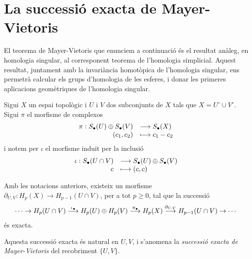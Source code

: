 \documentclass[../main.tex]{subfiles}
\begin{document}
\section{La successió exacta de Mayer-Vietoris}
El teorema de Mayer-Vietoris que enunciem a continuació és el resultat anàleg, en homologia singular, al corresponent teorema de l'homologia simplicial. Aquest resultat, juntament amb la invariància homotòpica de l'homologia singular, ens permetrà calcular els grups d'homologia de les esferes, i donar les primeres aplicacions geomètriques de l'homologia singular.

Sigui $X$ un espai topològic i $U$ i $V$ dos subconjunts de $X$ tals que $X = U^\circ\cup V^\circ$. Sigui $\pi$ el morfisme de complexos
\begin{equation}
    \notag
    \begin{array}{rl}
        \pi:S_\bullet(U)\oplus S_\bullet(V) & \longrightarrow S_\bullet(X) \\
        (c_1,c_2) & \longmapsto c_1-c_2
    \end{array}
\end{equation}
i notem per $\iota$ el morfisme induit per la inclusió
\begin{equation}
    \notag
    \begin{array}{rl}
        \iota:S_\bullet(U\cap V) & \longrightarrow S_\bullet(U)\oplus S_\bullet(V) \\
        c & \longmapsto (c,c)
    \end{array}
\end{equation}


\begin{ter}
Amb les notacions anteriors, existeix un morfisme $\partial_{U,V}:H_p(X)\rightarrow H_{p-1}(U\cap V)$, per a tot $p\geq 0$, tal que la successió
\begin{equation}
    \notag
    \cdots \rightarrow H_p(U\cap V)\overset{\iota_\bullet}{\longrightarrow}H_p(U)\oplus H_p(V)\overset{\pi_\bullet}{\longrightarrow} H_p(X)\overset{\partial_{U,V}}{\longrightarrow}H_{p-1}(U\cap V)\rightarrow\cdots
\end{equation}
és exacta.
\end{ter}

Aquesta successió exacta és natural en $U,V$, i s'anomena la \textit{successió exacta de Mayer-Vietoris} del recobriment $\{U,V\}$.
\end{document}
